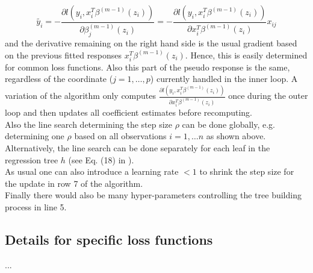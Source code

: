 \documentclass{article}
\begin{document}
%
\begin{equation}
\tilde{y_i} = - \frac{\partial l(y_i, x_i^T\beta^{(m-1)}(z_i))}{\partial \beta_j^{(m-1)}(z_i)} = - \frac{\partial l(y_i, x_i^T\beta^{(m-1)}(z_i))}{\partial x_i^T\beta^{(m-1)}(z_i)}x_{ij}
\end{equation}
%
and the derivative remaining on the right hand side is the usual gradient based on the previous fitted responses $x_i^T\beta^{(m-1)}(z_i)$. Hence, this is easily determined for common loss functions. Also this part of the pseudo response is the same, regardless of the coordinate ($j = 1, \dots, p$) currently handled in the inner loop. A variation of the algorithm only computes $\frac{\partial l(y_i, x_i^T\beta^{(m-1)}(z_i))}{\partial x_i^T\beta^{(m-1)}(z_i)}$ once during the outer loop and then updates all coefficient estimates before recomputing.\\
Also the line search determining the step size $\rho$ can be done globally, e.g. determining one $\rho$ based on all observations $i = 1, \dots n$ as shown above. Alternatively, the line search can be done separately for each leaf in the regression tree $h$ (see Eq. (18) in \cite{friedman2001greedy}).\\
As usual one can also introduce a learning rate $ < 1$ to shrink the step size for the update in row 7 of the algorithm.\\
Finally there would also be many hyper-parameters controlling the tree building process in line 5.

\subsection{Details for specific loss functions}
...

\printbibliography
\end{document}
